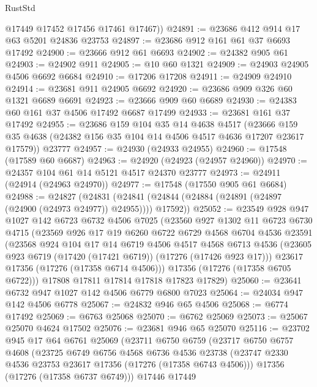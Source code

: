 \begin{lexlean}{RustStd}
\begin{coremodule}
        @17449
        @17452
        @17456
        @17461
        @17467))
@24891 := @23686 @412 @914 @17 @63 @5201 @24836 @23753
@24897 := @23686 @912 @161 @61 @37 @6693 @17492
@24900 := @23666 @912 @61 @6693
@24902 := @24382 @905 @61
@24903 := @24902 @911
@24905 := @10 @60 @1321
@24909 := @24903 @24905 @4506 @6692 @6684
@24910 := @17206 @17208
@24911 := @24909 @24910
@24914 := @23681 @911 @24905 @6692
@24920 := @23686 @909 @326 @60 @1321 @6689 @6691
@24923 := @23666 @909 @60 @6689
@24930 := @24383 @60 @161 @37 @4506 @17492 @6687 @17499
@24933 := @23681 @161 @37 @17492
@24955 := @23686
    @159
    @104
    @35
    @14
    @4638
    @4517
    (@23666 @159 @35 @4638 (@24382 @156 @35 @104 @14 @4506 @4517 @4636 @17207 @23617 @17579))
    @23777
@24957 := @24930 (@24933 @24955)
@24960 := @17548 (@17589 @60 @6687)
@24963 := @24920 (@24923 (@24957 @24960))
@24970 := @24357 @104 @61 @14 @5121 @4517 @24370 @23777
@24973 := @24911 (@24914 (@24963 @24970))
@24977 := @17548 (@17550 @905 @61 @6684)
@24988 := @24827
    (@24831 (@24841 (@24844 (@24884 (@24891 (@24897 (@24900 (@24973 @24977)) @24955)))) @17592))
@25052 := @23549
    @928
    @947
    @1027
    @142
    @6723
    @6732
    @4506
    @7025
    (@23560
      @927
      @1302
      @11
      @6723
      @6730
      @4715
      (@23569
        @926
        @17
        @19
        @6260
        @6722
        @6729
        @4568
        @6704
        @4536
        @23591
        (@23568
          @924
          @104
          @17
          @14
          @6719
          @4506
          @4517
          @4568
          @6713
          @4536
          (@23605 @923 @6719 (@17420 (@17421 @6719)) (@17276 (@17426 @923 @17)))
          @23617
          @17356
          (@17276 (@17358 @6714 @4506)))
        @17356
        (@17276 (@17358 @6705 @6722)))
      @17808
      @17811
      @17814
      @17818
      @17823
      @17829)
@25060 := @23641 @6732 @947 @1027 @142 @4506 @6779 @6800 @7023
@25064 := @24034 @947 @142 @4506 @6778
@25067 := @24832 @946 @65 @4506
@25068 := @6774 @17492
@25069 := @6763 @25068
@25070 := @6762 @25069
@25073 := @25067 @25070 @4624 @17502
@25076 := @23681 @946 @65 @25070
@25116 := @23702
    @945
    @17
    @64
    @6761
    @25069
    (@23711
      @6750
      @6759
      (@23717
        @6750
        @6757
        @4608
        (@23725
          @6749
          @6756
          @4568
          @6736
          @4536
          @23738
          (@23747 @2330 @4536 @23753 @23617 @17356 (@17276 (@17358 @6743 @4506)))
          @17356
          (@17276 (@17358 @6737 @6749)))
        @17446
        @17449

\end{coremodule}
\end{lexlean}

